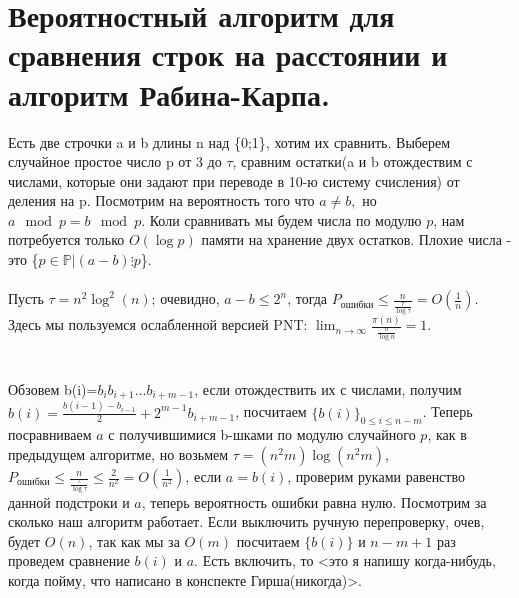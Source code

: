 \hypertarget{Рабин-Карп}{\section{Вероятностный алгоритм для сравнения строк на расстоянии и алгоритм Рабина-Карпа.}}


Есть две строчки a и b длины n над \{0;1\}, хотим их сравнить. Выберем случайное простое число p от 3 до $\tau$, сравним остатки(a и b отождествим с числами, которые они задают при переводе в 10-ю систему счисления) от деления на p. Посмотрим на вероятность того что $a\neq b,$ но $a\mod{p}=b\mod{p}$. Коли сравнивать мы будем числа по модулю $p$, нам потребуется только $O(\log p)$ памяти на хранение двух остатков.
Плохие числа - это \{$p\in\mathbb{P} | (a-b)\vdots p$\}.
\\
\\Пусть $\tau=n^2 \log^2(n)$; очевидно, $a-b\le 2^n$, тогда $P_{\text{ошибки}}\le\frac{n}{\frac{\tau}{\log\tau}}=O(\frac{1}{n})$. Здесь мы пользуемся ослабленной версией PNT: $\lim_{n\to\infty} \frac{\pi(n)}{\frac{n}{\log n}}=1$.
\\
\\
\\Обзовем b(i)=$b_i b_{i+1}...b_{i+m-1}$, если отождествить их с числами, получим $b(i)=\frac{b(i-1)-b_{i-1}}{2}+2^{m-1} b_{i+m-1}$, посчитаем $\{b(i)\}_{0\le i\le n-m}$. Теперь посравниваем $a$ с получившимися b-шками по модулю случайного $p$, как в предыдущем алгоритме, но возьмем $\tau=(n^2m)\log(n^2m)$, $P_{\text{ошибки}}\le\frac{n}{\frac{\tau}{\log\tau}}\le\frac{2}{n^2}=O(\frac{1}{n^2})$, если $a=b(i)$, проверим руками равенство данной подстроки и $a$, теперь вероятность ошибки равна нулю. Посмотрим за сколько наш алгоритм работает. Если выключить ручную перепроверку, очев, будет $O(n)$, так как мы за $O(m)$ посчитаем $\{b(i)\}$ и $n-m+1$ раз проведем сравнение $b(i)$ и $a$. Есть включить, то <это я напишу когда-нибудь, когда пойму, что написано в конспекте Гирша(никогда)>.